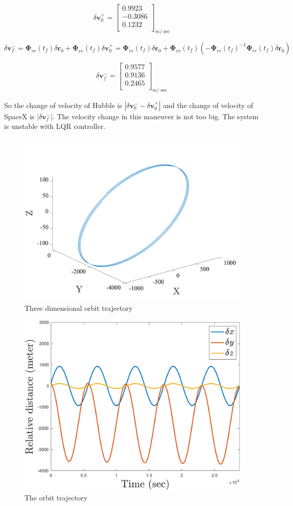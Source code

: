 $$
\delta \boldsymbol v_0^+ = \begin{bmatrix}
    0.9923\\
    -0.3086\\
    0.1232\\
\end{bmatrix}_{m/\sec}
$$

$$
\delta \boldsymbol v_f^- = \boldsymbol \Phi_{vr}(t_f) \delta \boldsymbol r_0 + \boldsymbol \Phi_{vv}(t_f) \delta \boldsymbol v_0^+ = \boldsymbol \Phi_{vr}(t_f) \delta \boldsymbol r_0 + \boldsymbol \Phi_{vv}(t_f) \left(-\boldsymbol \Phi_{rr}(t_f)^{-1} \boldsymbol \Phi_{rr}(t_f) \delta \boldsymbol r_0 \right)
$$


$$
\delta \boldsymbol v_f^- = \begin{bmatrix}
    0.9577\\
    0.9136\\
    0.2465\\
\end{bmatrix}_{m/\sec}
$$

So the change of velocity of Hubble is $|\delta \boldsymbol v_0^- - \delta \boldsymbol v_0^+|$ and the change of velocity of SpaceX is $|\delta \boldsymbol v_f^-|$. The velocity change in this maneuver is not too big. The system is unstable with LQR controller.

\begin{figure}[H]
    \caption{Three dimensional orbit trajectory}
    \centering
    \includegraphics[width=12cm]{../Figure/Bonus/3Dtraj}
\end{figure}

\begin{figure}[H]
    \caption{The orbit trajectory}
    \centering
    \includegraphics[width=12cm]{../Figure/Bonus/xyz}
\end{figure}